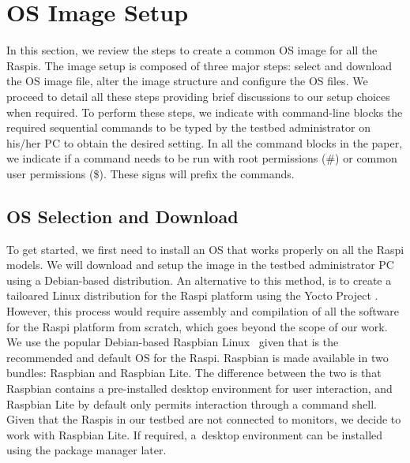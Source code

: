 \documentclass[electronics,article,accept,moreauthors,pdftex,10pt,a4paper]{mdpi}
\newcommand{\todot}[1]{%
  \textbf{\textcolor{red}{TO DO: #1}}
}
\theoremstyle{mdpi}
\newcounter{ex}
\newcounter{re}
\theoremstyle{mdpidefinition}
\begin{document}
\section{OS Image Setup}
%

\label{sec:image_setup}
In this section, we review the steps to create a common OS image for
all the Raspis. The image setup is composed of three major steps:
select and download the OS image file, alter the image structure and
configure the OS files. We proceed to detail all these steps providing
brief discussions to our setup choices when required. To perform these
steps, we indicate with command-line blocks the required sequential
commands to be typed by the testbed administrator on his/her PC
to obtain the desired setting. In all the command blocks in the paper, we indicate if a command needs to be run with root permissions (\#) or common user permissions (\$). These signs will prefix the commands.

\subsection{OS Selection and Download}

To get started, we first need to install an OS that works properly
on all the Raspi models. We will download and setup the image in
the testbed administrator PC using a Debian-based distribution.
An alternative to this method, is to create a tailoared Linux distribution
for the Raspi platform using the Yocto Project \cite{yocto}. However, this
process would require assembly and compilation of all the software for the
Raspi platform from scratch, which goes beyond the scope of our
work. We use the popular Debian-based Raspbian Linux~\cite{raspbian} given
that is the recommended and default OS for the Raspi. Raspbian is
made available in two bundles: Raspbian and Raspbian Lite. The difference
between the two is that Raspbian contains a pre-installed desktop environment
for user interaction, and Raspbian Lite by default only permits interaction
through a command shell. Given that the Raspis in our testbed are not
connected to monitors, we decide to work with Raspbian Lite.
If required, a~desktop environment can be installed using the package manager later.

\end{document}

